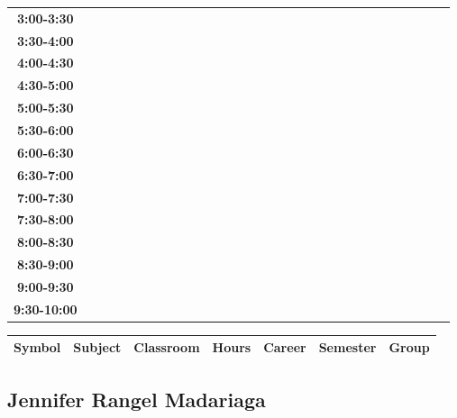 \documentclass{article}
\begin{document}
\begin{table}[ht]
\begin{tabular}{|c|c|c|c|c|c|c|c|c|c|c|c|c|c|c|c|c|c|c|c|c|c|c|c|c|c|c|c|c|c|}
\textbf{3:00-3:30} &   &   &   &   &   &   &   \\
 \cline{1-8} 
\textbf{3:30-4:00} &   &   &   &   &   &   &   \\
 \cline{1-8} 
\textbf{4:00-4:30} &   &   &   &   &   &   &   \\
 \cline{1-8} 
\textbf{4:30-5:00} &   &   &   &   &   &   &   \\
 \cline{1-8} 
\textbf{5:00-5:30} &   &   &   &   &   &   &   \\
 \cline{1-8} 
\textbf{5:30-6:00} &   &   &   &   &   &   &   \\
 \cline{1-8} 
\textbf{6:00-6:30} &   &   &   &   &   &   &   \\
 \cline{1-8} 
\textbf{6:30-7:00} &   &   &   &   &   &   &   \\
 \cline{1-8} 
\textbf{7:00-7:30} &   &   &   &   &   &   &   \\
 \cline{1-8} 
\textbf{7:30-8:00} &   &   &   &   &   &   &   \\
 \cline{1-8} 
\textbf{8:00-8:30} &   &   &   &   &   &   &   \\
 \cline{1-8} 
\textbf{8:30-9:00} &   &   &   &   &   &   &   \\
 \cline{1-8} 
\textbf{9:00-9:30} &   &   &   &   &   &   &   \\
 \cline{1-8} 
\textbf{9:30-10:00} &   &   &   &   &   &   &   \\
 \cline{1-8} 
\end{tabular}\end{table}

        
        \begin{tabular}{|>{\centering\arraybackslash}m{2cm}|>{\centering\arraybackslash}m{4cm}|>{\centering\arraybackslash}m{2cm}|>{\centering\arraybackslash}m{2cm}|>{\centering\arraybackslash}m{2cm}|>{\centering\arraybackslash}m{2cm}|>{\centering\arraybackslash}m{2cm}|}
        \hline
        \textbf{Symbol} & \textbf{Subject} & \textbf{Classroom} & \textbf{Hours} & \textbf{Career} & \textbf{Semester} & \textbf{Group} \\
        \hline
        \end{tabular}
                    

        \newpage
        

        \subsection{Jennifer Rangel Madariaga}
        \vspace*{.1cm}
        
\end{document}
